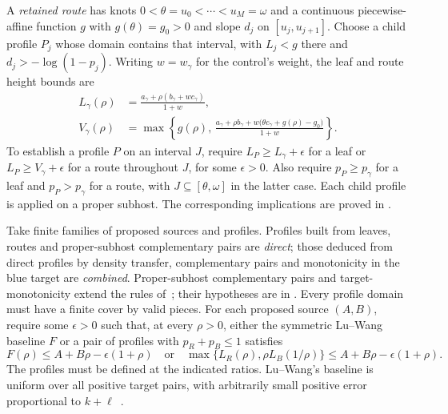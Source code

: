 A \emph{retained route} has knots
$0<\theta=u_0<\cdots<u_M=\omega$ and a continuous piecewise-affine
function $g$ with $g(\theta)=g_0>0$ and slope $d_j$ on
$[u_j,u_{j+1}]$. Choose a child profile $P_j$ whose domain contains
that interval, with $L_j<g$ there and $d_j>-\log(1-p_j)$.
Writing $w=w_\gamma$ for the control's weight, the leaf and route height bounds are
\begin{equation}\label{eq:route-output}
 \begin{aligned}
 L_\gamma(\rho)&=\frac{a_\gamma+\rho(b_\gamma+wc_\gamma)}{1+w},\\
 V_\gamma(\rho)&=\max\left\{g(\rho),\,
 \frac{a_\gamma+\rho b_\gamma+
 w\bigl(\theta c_\gamma+g(\rho)-g_0\bigr)}{1+w}\right\}.
 \end{aligned}
\end{equation}
To establish a profile $P$ on an interval $J$, require
$L_P\ge L_\gamma+\epsilon$ for a leaf or
$L_P\ge V_\gamma+\epsilon$ for a route throughout $J$, for some
$\epsilon>0$. Also require $p_P\ge p_\gamma$ for a leaf and
$p_P>p_\gamma$ for a route, with $J\subseteq[\theta,\omega]$ in the latter case.
Each child profile is
applied on a proper subhost. The corresponding implications are proved in
.

Take finite families of proposed sources and profiles. Profiles built
from leaves, routes and proper-subhost complementary pairs are
\emph{direct}; those deduced from direct profiles by density transfer,
complementary pairs and monotonicity in the blue target are \emph{combined}.
Proper-subhost complementary pairs and target-monotonicity extend the rules
of~\cite[Definitions~5.4--5.5]{ZBS}; their hypotheses are in
.
Every profile domain must have a finite cover by valid pieces.
For each proposed source $(A,B)$, require some $\epsilon>0$ such that,
at every $\rho>0$, either the symmetric Lu--Wang baseline $F$ or a
pair of profiles with $p_R+p_B\le1$ satisfies
\[
 F(\rho)\le A+B\rho-\epsilon(1+\rho)
 \quad\text{or}\quad
 \max\{L_R(\rho),\rho L_B(1/\rho)\}
 \le A+B\rho-\epsilon(1+\rho).
\]
The profiles must be defined at the indicated ratios. Lu--Wang's
baseline is uniform over all positive target pairs, with arbitrarily
small positive error proportional to $k+\ell$~\cite[Lemma~B.1]{LW}.

